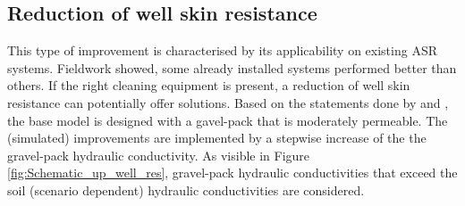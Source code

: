 
\subsection{Reduction of well skin resistance}
\label{subsec:Up_well_res}
This type of improvement is characterised by its applicability on existing ASR systems. Fieldwork showed, some already installed systems performed better than others. If the right cleaning equipment is present, a reduction of well skin resistance can potentially offer solutions. Based on the statements done by \citet{LeonardF.KonikowGeorgeZ.HornbergerKeithJ.Halford2009} and \citet{Houben2015}, the base model is designed with a gavel-pack that is moderately permeable. The (simulated) improvements are implemented by a stepwise increase of the the gravel-pack hydraulic conductivity. As visible in Figure \ref{fig:Schematic_up_well_res}, gravel-pack hydraulic conductivities that exceed the soil (scenario dependent) hydraulic conductivities are considered. 

%
%

